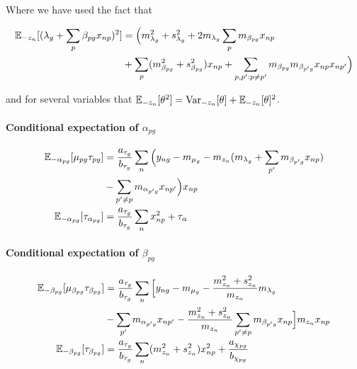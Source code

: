 Where we have used the fact that

\begin{equation}
  \begin{aligned}
\mathbb{E}_{-z_n}[(\lambda_g + \sum_p \beta_{pg} x_{np})^2] & =  \Big(m_{\lambda_g}^2 + s_{\lambda_g}^2 + 2m_{\lambda_g} \sum_p m_{\beta_{pg}} x_{np} \\
& +
 \sum_p (m_{\beta_{pg}}^2 + s_{\beta_{pg}}^2) x_{np} +
 \sum_{p,p': p \neq p'} m_{\beta_{pg}} m_{\beta_{p'g}} x_{np}x_{np'}
\Big)
\end{aligned}
\end{equation}

and for several variables that $\mathbb{E}_{-z_n}[\theta^2] = \text{Var}_{-z_n}[\theta] + \mathbb{E}_{-z_n}[\theta]^2$.

\paragraph{Conditional expectation of $\alpha_{pg}$}

\begin{equation}
\begin{aligned}
\mathbb{E}_{-\alpha_{pg}}[\mu_{pg} \tau_{pg}] & =
\frac{a_{\tau_g}}{b_{\tau_g}} \sum_n \Big (
y_{ng} - m_{\mu_g} - m_{z_n}( m_{\lambda_g} + \sum_{p'} m_{\beta_{p'g}} x_{np} ) \\
& - \sum_{p' \neq p} m_{\alpha_{p'g}} x_{np'}
\Big) x_{np} \\
\mathbb{E}_{-\alpha_{pg}}[\tau_{\alpha_{pg}}] & =
\frac{a_{\tau_g}}{b_{\tau_g}} \sum_n x_{np}^2 + \tau_\alpha
\end{aligned}
\end{equation}

\paragraph{Conditional expectation of $\beta_{pg}$}

\begin{equation}
\begin{aligned}
\mathbb{E}_{-\beta_{pg}}[\mu_{\beta_{pg}} \tau_{\beta_{pg}}] & =
\frac{a_{\tau_g}}{b_{\tau_g}} \sum_n \Big[
y_{ng} - m_{\mu_g} - \frac{m_{z_n}^2 + s_{z_n}^2}{m_{z_n}} m_{\lambda_g} \\
& - \sum_{p'} m_{\alpha_{p'g}} x_{np'}
- \frac{m_{z_n}^2 + s_{z_n}^2}{m_{z_n}} \sum_{p' \neq p} m_{\beta_{p'g}} x_{np}
\Big] m_{z_n} x_{np} \\
\mathbb{E}_{-\beta_{pg}} [ \tau_{\beta_{pg}} ] & =
\frac{a_{\tau_g}}{b_{\tau_g}} \sum_n (m_{z_n}^2 + s_{z_n}^2) x_{np}^2 +
\frac{a_{\chi_{pg}}}{b_{\chi_{pg}}}
\end{aligned}
\end{equation}

